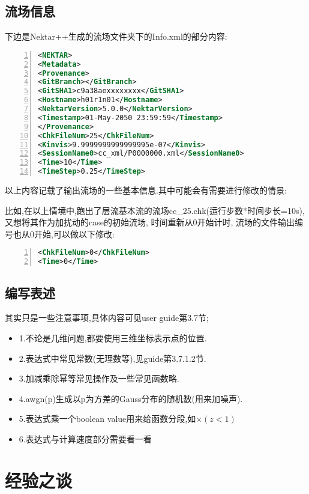\subsection{流场信息}
下边是Nektar++生成的流场文件夹下的Info.xml的部分内容:
\begin{lstlisting}[frame=single,numbers=left,language=XML]
<NEKTAR>
<Metadata>
<Provenance>
<GitBranch></GitBranch>
<GitSHA1>c9a38aexxxxxxxx</GitSHA1>
<Hostname>h01r1n01</Hostname>
<NektarVersion>5.0.0</NektarVersion>
<Timestamp>01-May-2050 23:59:59</Timestamp>
</Provenance>
<ChkFileNum>25</ChkFileNum>
<Kinvis>9.9999999999999995e-07</Kinvis>
<SessionName0>cc_xml/P0000000.xml</SessionName0>
<Time>10</Time>
<TimeStep>0.25</TimeStep>
\end{lstlisting}
\par
以上内容记载了输出流场的一些基本信息.其中可能会有需要进行修改的情景:\par

比如,在以上情境中,跑出了层流基本流的流场cc\_25.chk(运行步数*时间步长=10s), 又想将其作为加扰动的case的初始流场, 时间重新从0开始计时, 流场的文件输出编号也从0开始,可以做以下修改:\par

\begin{lstlisting}[frame=single,numbers=left,language=XML]
<ChkFileNum>0</ChkFileNum>
<Time>0</Time>
\end{lstlisting}
\par


\subsection{编写表述}
其实只是一些注意事项,具体内容可见user guide第3.7节;
\begin{itemize}
	\item{1.不论是几维问题,都要使用三维坐标表示点的位置.}
	\item{2.表达式中常见常数(无理数等),见guide第3.7.1.2节.}
	\item{3.加减乘除幂等常见操作及一些常见函数略.}
	\item{4.awgn(p)生成以p为方差的Gauss分布的随机数(用来加噪声).}
	\item{5.表达式乘一个boolean value用来给函数分段,如$\times (z<1)$}
	\item{6.表达式与计算速度部分需要看一看~}
\end{itemize}

\section{经验之谈}

